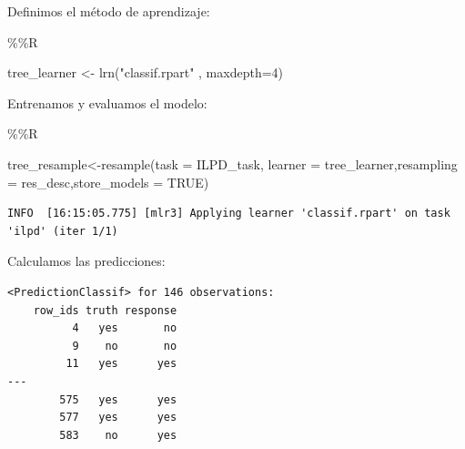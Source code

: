 \documentclass[
  11pt,
  a4paper,
]{article}
\newenvironment{Shaded}{\begin{snugshade}}{\end{snugshade}}
\newcommand{\AttributeTok}[1]{\textcolor[rgb]{0.77,0.63,0.00}{#1}}
\newcommand{\ConstantTok}[1]{\textcolor[rgb]{0.00,0.00,0.00}{#1}}
\newcommand{\DecValTok}[1]{\textcolor[rgb]{0.00,0.00,0.81}{#1}}
\newcommand{\FunctionTok}[1]{\textcolor[rgb]{0.00,0.00,0.00}{#1}}
\newcommand{\NormalTok}[1]{#1}
\newcommand{\OtherTok}[1]{\textcolor[rgb]{0.56,0.35,0.01}{#1}}
\newcommand{\SpecialCharTok}[1]{\textcolor[rgb]{0.00,0.00,0.00}{#1}}
\newcommand{\StringTok}[1]{\textcolor[rgb]{0.31,0.60,0.02}{#1}}
\begin{document}
Definimos el método de aprendizaje:

\begin{Shaded}
\begin{Highlighting}[]
\SpecialCharTok{\%\%}\NormalTok{R}

\NormalTok{tree\_learner }\OtherTok{\textless{}{-}} \FunctionTok{lrn}\NormalTok{(}\StringTok{"classif.rpart"}\NormalTok{ , }\AttributeTok{maxdepth=}\DecValTok{4}\NormalTok{)}
\end{Highlighting}
\end{Shaded}

Entrenamos y evaluamos el modelo:

\begin{Shaded}
\begin{Highlighting}[]
\SpecialCharTok{\%\%}\NormalTok{R}

\NormalTok{tree\_resample}\OtherTok{\textless{}{-}}\FunctionTok{resample}\NormalTok{(}\AttributeTok{task =}\NormalTok{ ILPD\_task, }\AttributeTok{learner =}\NormalTok{ tree\_learner,}\AttributeTok{resampling =}\NormalTok{ res\_desc,}\AttributeTok{store\_models =} \ConstantTok{TRUE}\NormalTok{)}
\end{Highlighting}
\end{Shaded}

\begin{verbatim}
INFO  [16:15:05.775] [mlr3] Applying learner 'classif.rpart' on task 'ilpd' (iter 1/1)
\end{verbatim}

Calculamos las predicciones:

\begin{Shaded}
\end{Shaded}

\begin{verbatim}
<PredictionClassif> for 146 observations:
    row_ids truth response
          4   yes       no
          9    no       no
         11   yes      yes
---                       
        575   yes      yes
        577   yes      yes
        583    no      yes
\end{verbatim}

\newpage
\end{document}

